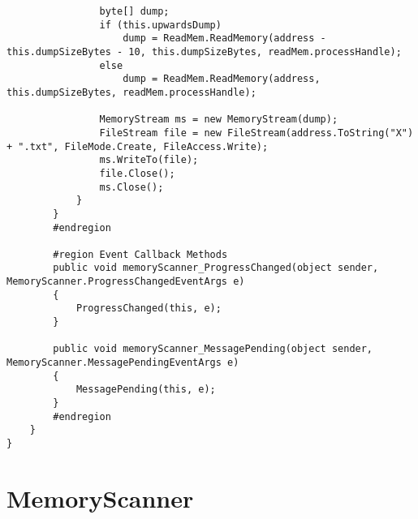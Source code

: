 \begin{lstlisting}
                byte[] dump;
                if (this.upwardsDump)
                    dump = ReadMem.ReadMemory(address - this.dumpSizeBytes - 10, this.dumpSizeBytes, readMem.processHandle);
                else
                    dump = ReadMem.ReadMemory(address, this.dumpSizeBytes, readMem.processHandle);

                MemoryStream ms = new MemoryStream(dump);
                FileStream file = new FileStream(address.ToString("X") + ".txt", FileMode.Create, FileAccess.Write);
                ms.WriteTo(file);
                file.Close();
                ms.Close();
            }
        }
        #endregion

        #region Event Callback Methods
        public void memoryScanner_ProgressChanged(object sender, MemoryScanner.ProgressChangedEventArgs e)
        {
            ProgressChanged(this, e);
        }

        public void memoryScanner_MessagePending(object sender, MemoryScanner.MessagePendingEventArgs e)
        {
            MessagePending(this, e);
        }
        #endregion
    }
}

\end{lstlisting}

\section{MemoryScanner}

